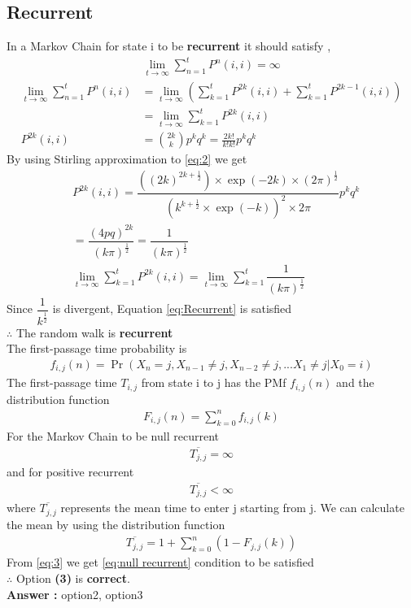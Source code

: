 \documentclass[journal,12pt,twocolumn]{IEEEtran}
\begin{document}
\subsection{Recurrent}
In a Markov Chain for state i to be \textbf{recurrent} it should satisfy ,
\begin{align}
\lim_{t \to \infty} \sum_{n=1}^{t} P^n(i,i) = \infty \label{eq:Recurrent}
\end{align}
\begin{align}
\lim_{t \to \infty} \sum_{n=1}^{t} P^n(i,i) &= \lim_{t \to \infty}\left(\sum_{k=1}^{t} P^{2k}(i,i) + \sum_{k=1}^{t} P^{2k-1}(i,i)\right)\\
&= \lim_{t \to \infty}\sum_{k=1}^{t} P^{2k}(i,i)\\
P^{2k}(i,i) &= \binom{2k}{k}p^kq^k  = \frac{2k !}{k!k!}p^kq^k \label{eq:2}
\end{align}
By using Stirling approximation to \eqref{eq:2} we get 
\begin{align}
&P^{2k}(i,i) = \dfrac{ \left((2k)^{2k+\frac{1}{2}}\right)\times \exp(-2k)\times(2\pi)^{\frac{1}{2}}}{\left(k^{k+\frac{1}{2}}\times \exp(-k)\right)^2\times
2\pi}p^kq^k\\
&= \dfrac{(4pq)^{2k}}{(k\pi)^{\frac{1}{2}}} = \dfrac{1}{(k\pi)^{\frac{1}{2}}}\\
&\lim_{t \to \infty}\sum_{k=1}^{t} P^{2k}(i,i) = \lim_{t \to \infty}\sum_{k=1}^{t} \dfrac{1}{(k\pi)^{\frac{1}{2}}}
\end{align}
Since $\dfrac{1}{k^\frac{1}{2}}$ is divergent, Equation \eqref{eq:Recurrent} is satisfied\\
$\therefore$ The random walk is \textbf{recurrent}\\
The first-passage time probability is 
\begin{align}
f_{i,j}(n) = \Pr(X_n = j, X_{n-1} \neq j, X_{n-2} \neq j, ... X_1 \neq j | X_0 = i )
\end{align}
The first-passage time $T_{i,j}$ from state i to j has the PMf $f_{i,j}(n)$ and the distribution function
\begin{align}
F_{i,j}(n) = \sum _{k=0}^n f_{i,j}(k) \label{eq:3}
\end{align}
For the Markov Chain to be null recurrent 
\begin{align}
\overline{T_{j,j}} = \infty \label{eq:null recurrent}
\end{align}
and for positive recurrent 
\begin{align}
\overline{T_{j,j}} < \infty
\end{align}
where $\overline{T_{j,j}}$ represents the mean time to enter j starting from j. We can calculate the mean by using the distribution function 
\begin{align}
\overline{T_{j,j}} = 1 + \sum _{k=0}^n \left(1 - F_{j,j}(k)\right)
\end{align}
From \eqref{eq:3} we get \eqref{eq:null recurrent} condition to be satisfied \\
$\therefore$ Option \textbf{(3)} is \textbf{correct}.\\
\textbf{Answer :} option2, option3
\end{document}
